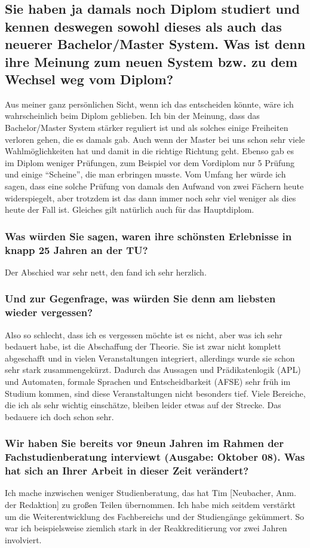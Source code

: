 {\subsection*{Sie haben ja damals noch Diplom studiert und kennen deswegen sowohl dieses als auch das neuerer Bachelor/Master System. Was ist denn ihre Meinung zum neuen System bzw. zu dem Wechsel weg vom Diplom?}
Aus meiner ganz persönlichen Sicht, wenn ich das entscheiden könnte, wäre ich wahrscheinlich beim Diplom geblieben. Ich bin der Meinung, dass das Bachelor/Master System stärker reguliert ist und als solches einige Freiheiten verloren gehen, die es damals gab. Auch wenn der Master bei uns schon sehr viele Wahlmöglichkeiten hat und damit in die richtige Richtung geht. Ebenso gab es im Diplom weniger Prüfungen, zum Beispiel vor dem Vordiplom nur 5 Prüfung und einige "`Scheine"', die man erbringen musste. Vom Umfang her würde ich sagen, dass eine solche Prüfung von damals den Aufwand von zwei Fächern heute widerspiegelt, aber trotzdem ist das dann immer noch sehr viel weniger als dies heute der Fall ist. Gleiches gilt natürlich auch für das Hauptdiplom.
\subsubsection*{Was würden Sie sagen, waren ihre schönsten Erlebnisse in knapp 25 Jahren an der TU?}
Der Abschied war sehr nett, den fand ich sehr herzlich.
\subsubsection*{Und zur Gegenfrage, was würden Sie denn am liebsten wieder vergessen?}
Also so schlecht, dass ich es vergessen möchte ist es nicht, aber was ich sehr bedauert habe, ist die Abschaffung der Theorie. Sie ist zwar nicht komplett abgeschafft und in vielen Veranstaltungen integriert, allerdings wurde sie schon sehr stark zusammengekürzt. Dadurch das Aussagen und Prädikatenlogik (APL) und Automaten, formale Sprachen und Entscheidbarkeit (AFSE) sehr früh im Studium kommen, sind diese Veranstaltungen nicht besonders tief. Viele Bereiche, die ich als sehr wichtig einschätze, bleiben leider etwas auf der Strecke. Das bedauere ich doch schon sehr. 
\subsubsection*{Wir haben Sie bereits vor 9neun Jahren im Rahmen der Fachstudienberatung interviewt (Ausgabe: Oktober 08). Was hat sich an Ihrer Arbeit in dieser Zeit verändert?}
Ich mache inzwischen weniger Studienberatung, das hat Tim [Neubacher, Anm. der Redaktion] zu großen Teilen übernommen. Ich habe mich seitdem verstärkt um die Weiterentwicklung des Fachbereichs und der Studiengänge gekümmert. So war ich beispielsweise ziemlich stark in der Reakkreditierung vor zwei Jahren involviert.
}
